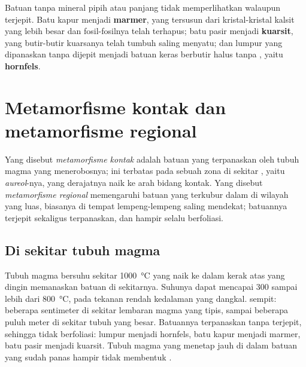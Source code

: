 Batuan tanpa mineral pipih atau panjang tidak memperlihatkan  walaupun
terjepit. Batu kapur menjadi \textbf{marmer}, yang tersusun dari kristal-kristal
kalsit yang lebih besar dan fosil-fosilnya telah terhapus; batu pasir menjadi
\textbf{kuarsit}, yang butir-butir kuarsanya telah tumbuh saling menyatu; dan
lumpur yang dipanaskan tanpa dijepit menjadi batuan keras berbutir halus tanpa
, yaitu \textbf{hornfels}.

\section{Metamorfisme kontak dan metamorfisme regional}

\begin{definition}\label{def:g12:metamorphic-rocks:contact-regional}
Yang disebut \emph{metamorfisme kontak} adalah
 batuan yang terpanaskan oleh tubuh magma yang menerobosnya;
 ini terbatas pada sebuah zona di sekitar , yaitu
\emph{aureol}-nya, yang derajatnya naik ke arah bidang kontak.
Yang disebut \emph{metamorfisme regional}
memengaruhi batuan yang terkubur dalam di wilayah yang luas, biasanya di tempat
lempeng-lempeng saling mendekat; batuannya terjepit sekaligus terpanaskan, dan
hampir selalu berfoliasi.
\end{definition}

\subsection{Di sekitar tubuh magma}

Tubuh magma bersuhu sekitar \qty{1000}{\celsius} yang naik ke dalam kerak atas
yang dingin memanaskan batuan di sekitarnya. Suhunya dapat mencapai 300 sampai
lebih dari \qty{800}{\celsius}, pada tekanan rendah kedalaman yang dangkal.
 sempit: beberapa sentimeter di sekitar lembaran magma yang tipis,
sampai beberapa puluh meter di sekitar tubuh yang besar. Batuannya terpanaskan
tanpa terjepit, sehingga tidak berfoliasi: lumpur menjadi hornfels, batu kapur
menjadi marmer, batu pasir menjadi kuarsit. Tubuh magma yang menetap jauh di
dalam batuan yang sudah panas hampir tidak membentuk .

